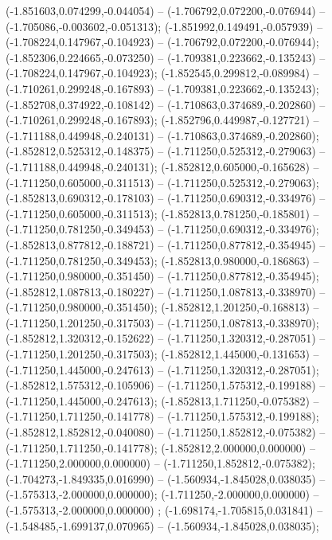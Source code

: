  (-1.851603,0.074299,-0.044054) -- (-1.706792,0.072200,-0.076944) -- (-1.705086,-0.003602,-0.051313);
 (-1.851992,0.149491,-0.057939) -- (-1.708224,0.147967,-0.104923) -- (-1.706792,0.072200,-0.076944);
 (-1.852306,0.224665,-0.073250) -- (-1.709381,0.223662,-0.135243) -- (-1.708224,0.147967,-0.104923);
 (-1.852545,0.299812,-0.089984) -- (-1.710261,0.299248,-0.167893) -- (-1.709381,0.223662,-0.135243);
 (-1.852708,0.374922,-0.108142) -- (-1.710863,0.374689,-0.202860) -- (-1.710261,0.299248,-0.167893);
 (-1.852796,0.449987,-0.127721) -- (-1.711188,0.449948,-0.240131) -- (-1.710863,0.374689,-0.202860);
 (-1.852812,0.525312,-0.148375) -- (-1.711250,0.525312,-0.279063) -- (-1.711188,0.449948,-0.240131);
 (-1.852812,0.605000,-0.165628) -- (-1.711250,0.605000,-0.311513) -- (-1.711250,0.525312,-0.279063);
 (-1.852813,0.690312,-0.178103) -- (-1.711250,0.690312,-0.334976) -- (-1.711250,0.605000,-0.311513);
 (-1.852813,0.781250,-0.185801) -- (-1.711250,0.781250,-0.349453) -- (-1.711250,0.690312,-0.334976);
 (-1.852813,0.877812,-0.188721) -- (-1.711250,0.877812,-0.354945) -- (-1.711250,0.781250,-0.349453);
 (-1.852813,0.980000,-0.186863) -- (-1.711250,0.980000,-0.351450) -- (-1.711250,0.877812,-0.354945);
 (-1.852812,1.087813,-0.180227) -- (-1.711250,1.087813,-0.338970) -- (-1.711250,0.980000,-0.351450);
 (-1.852812,1.201250,-0.168813) -- (-1.711250,1.201250,-0.317503) -- (-1.711250,1.087813,-0.338970);
 (-1.852812,1.320312,-0.152622) -- (-1.711250,1.320312,-0.287051) -- (-1.711250,1.201250,-0.317503);
 (-1.852812,1.445000,-0.131653) -- (-1.711250,1.445000,-0.247613) -- (-1.711250,1.320312,-0.287051);
 (-1.852812,1.575312,-0.105906) -- (-1.711250,1.575312,-0.199188) -- (-1.711250,1.445000,-0.247613);
 (-1.852813,1.711250,-0.075382) -- (-1.711250,1.711250,-0.141778) -- (-1.711250,1.575312,-0.199188);
 (-1.852812,1.852812,-0.040080) -- (-1.711250,1.852812,-0.075382) -- (-1.711250,1.711250,-0.141778);
 (-1.852812,2.000000,0.000000) -- (-1.711250,2.000000,0.000000) -- (-1.711250,1.852812,-0.075382);
 (-1.704273,-1.849335,0.016990) -- (-1.560934,-1.845028,0.038035) -- (-1.575313,-2.000000,0.000000);
 (-1.711250,-2.000000,0.000000) -- (-1.575313,-2.000000,0.000000) ;
 (-1.698174,-1.705815,0.031841) -- (-1.548485,-1.699137,0.070965) -- (-1.560934,-1.845028,0.038035);

